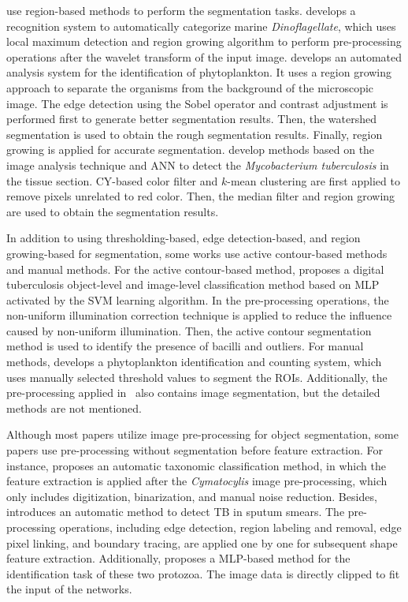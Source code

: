 \cite{Culverhouse-2000-DAMV,Schulze-2013-PAAS,Osman-2011-TBDZ,Osman-2012-OSEL} use region-based methods to perform the segmentation tasks. \cite{Culverhouse-2000-DAMV} develops a recognition system to automatically categorize marine \emph{Dinoflagellate}, which uses local maximum detection and region growing algorithm to perform pre-processing operations after the wavelet transform of the input image. \cite{Schulze-2013-PAAS} develops an automated analysis system for the identification of phytoplankton. It uses a region growing approach to separate the organisms from the background of the microscopic image. The edge detection using the Sobel operator and contrast adjustment is performed first to generate better segmentation results. Then, the watershed segmentation is used to obtain the rough segmentation results. Finally, region growing is applied for accurate segmentation. \cite{Osman-2011-TBDZ,Osman-2012-OSEL} develop methods based on the image analysis technique and ANN to detect the \emph{Mycobacterium tuberculosis} in the tissue section. CY-based color filter and $k$-mean clustering are first applied to remove pixels unrelated to red color. Then, the median filter and region growing are used to obtain the segmentation results.


In addition to using thresholding-based, edge detection-based, and region growing-based for segmentation, some works use active contour-based methods and manual methods. For the active contour-based method, \cite{Priya-2016-AOIL} proposes a digital tuberculosis object-level and image-level classification method based on MLP activated by the SVM learning algorithm. In the pre-processing operations, the non-uniform illumination correction technique is applied to reduce the influence caused by non-uniform illumination. Then, the active contour segmentation method is used to identify the presence of bacilli and outliers. For manual methods, \cite{Embleton-2003-ACPP} develops a phytoplankton identification and counting system, which uses manually selected threshold values to segment the ROIs. Additionally, the pre-processing applied in~\cite{Weller-2005-SCSO,Weller-2007-TSNN} also contains image segmentation, but the detailed methods are not mentioned.

Although most papers utilize image pre-processing for object segmentation, some papers use pre-processing without segmentation before feature extraction. For instance, \cite{Culverhouse-1994-ACFS} proposes an automatic taxonomic classification method, in which the feature extraction is applied after the \emph{Cymatocylis} image pre-processing, which only includes digitization, binarization, and manual noise reduction. Besides, \cite{Veropoulos-1998-IPNC} introduces an automatic method to detect TB in sputum smears. The pre-processing operations, including edge detection, region labeling and removal, edge pixel linking, and boundary tracing, are applied one by one for subsequent shape feature extraction. Additionally, \cite{Widmer-2005-UANN} proposes a MLP-based method for the identification task of these two protozoa. The image data is directly clipped to fit the input of the networks.


